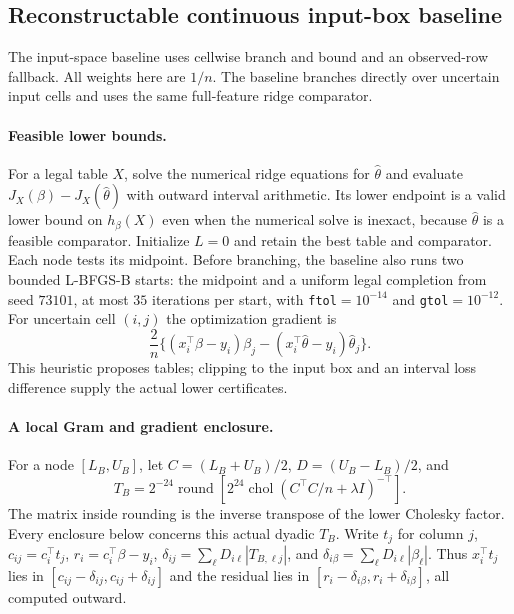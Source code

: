 \subsection{Reconstructable continuous input-box baseline}\label{app:input-baseline-v78}\label{app:input}
The input-space baseline uses cellwise branch and bound and an observed-row fallback. All weights here are $1/n$. The baseline branches directly over uncertain input cells and uses the same full-feature ridge comparator.

\paragraph{Feasible lower bounds.}
For a legal table $X$, solve the numerical ridge equations for $\widehat\theta$ and evaluate $J_X(\beta)-J_X(\widehat\theta)$ with outward interval arithmetic. Its lower endpoint is a valid lower bound on $h_\beta(X)$ even when the numerical solve is inexact, because $\widehat\theta$ is a feasible comparator. Initialize $L=0$ and retain the best table and comparator. Each node tests its midpoint. Before branching, the baseline also runs two bounded L-BFGS-B starts: the midpoint and a uniform legal completion from seed $73101$, at most $35$ iterations per start, with \texttt{ftol}$=10^{-14}$ and \texttt{gtol}$=10^{-12}$. For uncertain cell $(i,j)$ the optimization gradient is
\[
 \frac{2}{n}\{(x_i^\top\beta-y_i)\beta_j-(x_i^\top\widehat\theta-y_i)\widehat\theta_j\}.
\]
This heuristic proposes tables; clipping to the input box and an interval loss difference supply the actual lower certificates.

\paragraph{A local Gram and gradient enclosure.}
For a node $[L_B,U_B]$, let $C=(L_B+U_B)/2$, $D=(U_B-L_B)/2$, and
\[
 T_B=2^{-24}\operatorname{round}\!\left[2^{24}\operatorname{chol}
 (C^\top C/n+\lambda I)^{-\top}\right].
\]
The matrix inside rounding is the inverse transpose of the lower Cholesky factor. Every enclosure below concerns this actual dyadic $T_B$. Write $t_j$ for column $j$, $c_{ij}=c_i^\top t_j$, $r_i=c_i^\top\beta-y_i$, $\delta_{ij}=\sum_\ell D_{i\ell}|T_{B,\ell j}|$, and $\delta_{i\beta}=\sum_\ell D_{i\ell}|\beta_\ell|$. Thus $x_i^\top t_j$ lies in $[c_{ij}-\delta_{ij},c_{ij}+\delta_{ij}]$ and the residual lies in $[r_i-\delta_{i\beta},r_i+\delta_{i\beta}]$, all computed outward.

